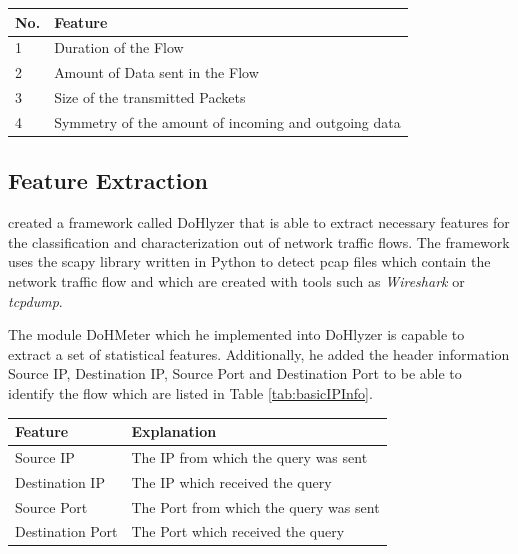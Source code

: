 \begin{center}
\begin{longtable}{  |l|l| }
\hline
No. & Feature \\
\hline
1 & Duration of the Flow \\
\hline
2 & Amount of Data sent in the Flow \\
\hline
3 & Size of the transmitted Packets \\
\hline
4 & Symmetry of the amount of incoming and outgoing data \\
\hline
\end{longtable}
\label{tab:important_features}
\end{center}

\subsection{Feature Extraction} \label{feature_extraction}
\cite{montazerishatoori2020anomaly} created a framework called DoHlyzer \cite{DoHlyzer} that is able to extract necessary features for the classification and characterization out of network traffic flows. The framework uses the scapy \cite{Scapy} library written in Python to detect pcap files which contain the network traffic flow and which are created with tools such as \textit{Wireshark} or \textit{tcpdump}.

The module DoHMeter which he implemented into DoHlyzer is capable to extract a set of statistical features. Additionally, he added the header information Source IP, Destination IP, Source Port and Destination Port to be able to identify the flow which are listed in Table \ref{tab:basicIPInfo}. 

\begin{center}
\begin{tabular}{ |l|l| }
\hline
Feature & Explanation \\
\hline\hline
Source IP & The IP from which the query was sent \\
\hline
Destination IP & The IP which received the query \\
\hline
Source Port & The Port from which the query was sent \\
\hline
Destination Port & The Port which received the query \\
\hline
\end{tabular}
 \label{tab:basicIPInfo} 
\end{center}

